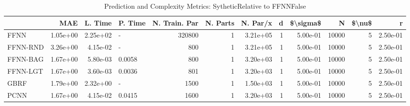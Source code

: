 \begin{table}
\centering
\caption{Prediction and Complexity Metrics: SytheticRelative to FFNNFalse}
\label{tab__Sythetic__Fix_Neurons_QTrue}
\begin{tabular}{lrrlrrrrrrrr}
\toprule
{} &      MAE &  L. Time & P. Time &  N. Train. Par &  N. Parts &  N. Par/x &  d &  \$\textbackslash sigma\$ &      N &  \$\textbackslash nu\$ &        r \\
\midrule
FFNN     & 1.05e+00 & 2.25e+02 &       - &         320800 &         1 &  3.21e+05 &  1 &  5.00e-01 &  10000 &      5 & 2.50e-01 \\
FFNN-RND & 3.26e+00 & 4.15e-02 &       - &            800 &         1 &  3.21e+05 &  1 &  5.00e-01 &  10000 &      5 & 2.50e-01 \\
FFNN-BAG & 1.67e+00 & 5.80e-03 &  0.0058 &            800 &         1 &  3.20e+03 &  1 &  5.00e-01 &  10000 &      5 & 2.50e-01 \\
FFNN-LGT & 1.67e+00 & 3.60e-03 &  0.0036 &            801 &         1 &  3.20e+03 &  1 &  5.00e-01 &  10000 &      5 & 2.50e-01 \\
GBRF     & 1.79e+00 & 2.32e+00 &       - &           1500 &         1 &  1.50e+03 &  1 &  5.00e-01 &  10000 &      5 & 2.50e-01 \\
PCNN     & 1.67e+00 & 4.15e-02 &  0.0415 &           1600 &         1 &  3.20e+03 &  1 &  5.00e-01 &  10000 &      5 & 2.50e-01 \\
\bottomrule
\end{tabular}
\end{table}
